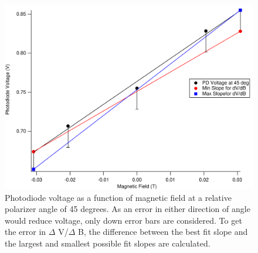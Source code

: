\documentclass[prb,preprint]{revtex4-1}
\begin{document}
\begin{figure}[h]

\includegraphics[width=180mm]{V_B_Slope.pdf}
\caption{\label{V_B Slope}Photodiode voltage as a function of magnetic field at a relative polarizer angle of 45 degrees. As an error in either direction of angle would reduce voltage, only down error bars are considered. To get the error in $\Delta$ V/$\Delta$ B, the difference between the best fit slope and the largest and smallest possible fit slopes are calculated.}
\end{figure}
\end{document}
